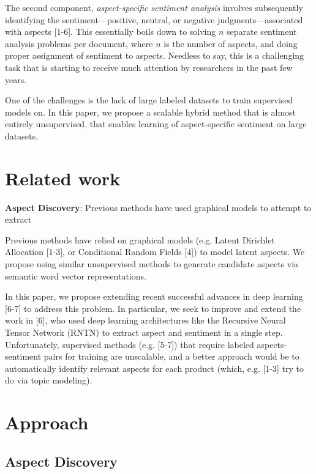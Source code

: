 \documentclass{article} %
\begin{document}
The second component, \textit{aspect-specific sentiment analysis} involves subsequently identifying the sentiment---positive, neutral, or negative judgments---associated with aspects [1-6]. This essentially boils down to solving $n$ separate sentiment analysis problems per document, where $n$ is the number of aspects, and doing proper assignment of sentiment to aspects. Needless to say, this is a challenging task that is starting to receive much attention by researchers in the past few years.

One of the challenges is the lack of large labeled datasets to train supervised models on. In this paper, we propose a scalable hybrid method that is almost entirely unsupervised, that enables learning of aspect-specific sentiment on large datasets.





\section{Related work}

\textbf{Aspect Discovery}: Previous methods have used graphical models to attempt to extract 

Previous methods have relied on graphical models (e.g. Latent Dirichlet Allocation [1-3], or Conditional Random Fields [4]) to model latent aspects. We propose using similar unsupervised methods to generate candidate aspects via semantic word vector representations. 

In this paper, we propose extending recent successful advances in deep learning [6-7] to address this problem. In particular, we seek to improve and extend the work in [6], who used deep learning architectures like the Recursive Neural Tensor Network (RNTN) to extract aspect and sentiment in a single step. Unfortunately, supervised methods (e.g. [5-7]) that require labeled aspects-sentiment pairs for training are unscalable, and a better approach would be to automatically identify relevant aspects for each product (which, e.g. [1-3] try to do via topic modeling). 




\section{Approach}


\subsection{Aspect Discovery}
\end{document}
